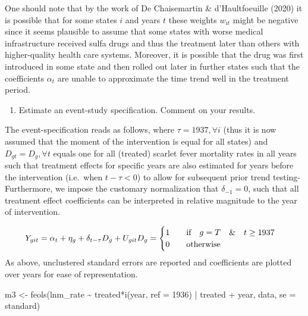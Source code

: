 \documentclass[
]{article}
\newenvironment{Shaded}{\begin{snugshade}}{\end{snugshade}}
\newcommand{\AttributeTok}[1]{\textcolor[rgb]{0.77,0.63,0.00}{#1}}
\newcommand{\DecValTok}[1]{\textcolor[rgb]{0.00,0.00,0.81}{#1}}
\newcommand{\FunctionTok}[1]{\textcolor[rgb]{0.00,0.00,0.00}{#1}}
\newcommand{\NormalTok}[1]{#1}
\newcommand{\OtherTok}[1]{\textcolor[rgb]{0.56,0.35,0.01}{#1}}
\newcommand{\SpecialCharTok}[1]{\textcolor[rgb]{0.00,0.00,0.00}{#1}}
\newcommand{\StringTok}[1]{\textcolor[rgb]{0.31,0.60,0.02}{#1}}
\providecommand{\tightlist}{%
  \setlength{\itemsep}{0pt}\setlength{\parskip}{0pt}}
\begin{document}
One should note that by the work of De Chaisemartin \& d'Haultfoeuille
(2020) it is possible that for some states \(i\) and years \(t\) these
weights \(w_{it}\) might be negative since it seems plausible to assume
that some states with worse medical infrastructure received sulfa drugs
and thus the treatment later than others with higher-quality health care
systems. Moreover, it is possible that the drug was first introduced in
some state and then rolled out later in further states such that the
coefficients \(\alpha_t\) are unable to approximate the time trend well
in the treatment period.

\begin{enumerate}
\def\labelenumi{\alph{enumi})}
\setcounter{enumi}{21}
\tightlist
\item
  Estimate an event-study specification. Comment on your results.
\end{enumerate}

The event-specification reads as follows, where \(\tau=1937, \forall i\)
(thus it is now assumed that the moment of the intervention is equal for
all states) and \(D_{gt}=D_{g},\forall t\) equals one for all (treated)
scarlet fever mortality rates in all years such that treatment effects
for specific years are also estimated for years before the intervention
(i.e.~when \(t-\tau<0\)) to allow for subsequent prior trend testing-
Furthermore, we impose the customary normalization that
\(\delta_{-1}=0\), such that all treatment effect coefficients can be
interpreted in relative magnitude to the year of intervention.

\[
Y_{git}=\alpha_t+\eta_g+\delta_{t-\tau} D_{g}+U_{git}\\
D_{g}=\begin{cases} 1 \qquad \text{if} \quad g=T \quad \& \quad t\geq1937 \\0 \qquad \text{otherwise} \end{cases}
\] As above, unclustered standard errors are reported and coefficients
are plotted over years for ease of representation.

\begin{Shaded}
\begin{Highlighting}[]
\NormalTok{m3 }\OtherTok{\textless{}{-}} \FunctionTok{feols}\NormalTok{(lnm\_rate }\SpecialCharTok{\textasciitilde{}}\NormalTok{ treated}\SpecialCharTok{*}\FunctionTok{i}\NormalTok{(year, }\AttributeTok{ref =} \DecValTok{1936}\NormalTok{) }\SpecialCharTok{|}\NormalTok{ treated }\SpecialCharTok{+}\NormalTok{ year, data,}
 \AttributeTok{se =} \StringTok{\textquotesingle{}standard\textquotesingle{}}\NormalTok{)}
\end{Highlighting}
\end{Shaded}
\end{document}
